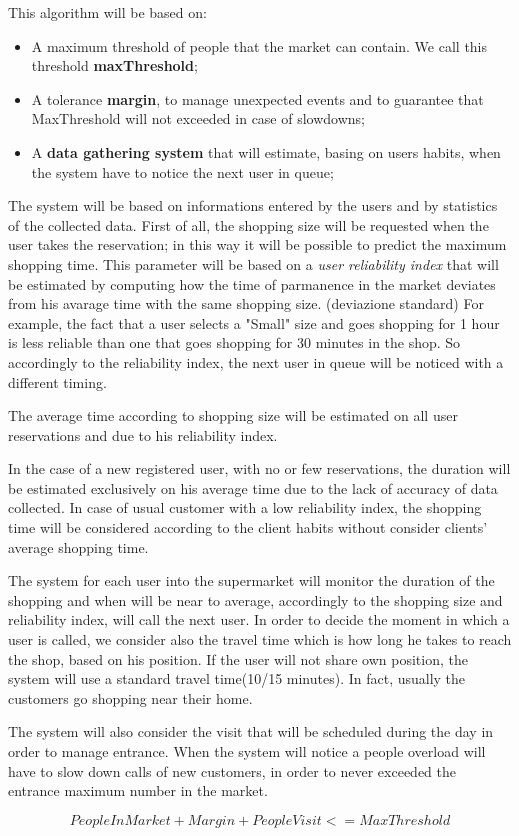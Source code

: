 This algorithm will be based on:
\begin{itemize}
\item A maximum threshold of people that the market can contain. We call this threshold \textbf{maxThreshold};
\item A tolerance \textbf{margin}, to manage unexpected events and to guarantee that MaxThreshold will not  exceeded in case of slowdowns;
\item A \textbf{data gathering system} that will estimate, basing on users habits, when the system have to notice the next user in queue;
\end{itemize}


The system will be based on informations entered by the users and by statistics of the collected data.
First of all, the shopping size will be requested when the user takes the reservation; in this way it will be possible to predict the maximum shopping time.
This parameter will be based on a \textit{user reliability index} that will be estimated by computing how the time of parmanence in the market deviates from his avarage time with the same shopping size. (deviazione standard)
For example, the fact that a user selects a "Small" size and goes shopping for 1 hour is less reliable than one that goes shopping for 30 minutes in the shop.
So accordingly to the reliability index, the next user in queue will be noticed with a different timing.

The average time according to shopping size will be estimated on all user reservations and  due to his reliability index.

 

In the case of a new registered user, with no or few reservations, the duration will be estimated exclusively on his average time due to the lack of accuracy of data collected.
In case of usual customer with a low reliability index, the shopping time will be considered according to the client habits without consider clients' average shopping time.

 

The system for each user into the supermarket will monitor the duration of the shopping and when will be near to average, accordingly to the shopping size and reliability index, will call the next user. In order to decide the moment in which a user is called, we consider also the travel time which is how long he takes to reach the shop, based on his position.
If the user will not share own position, the system will use a standard travel time(10/15 minutes). In fact, usually the customers go shopping near their home.

 

The system will also consider the visit that will be scheduled during the day in order to manage entrance.
When the system will notice a people overload will have to slow down calls of new customers, in order to never exceeded the entrance maximum number in the market. 
  
\[PeopleInMarket + Margin + PeopleVisit <= MaxThreshold\]

